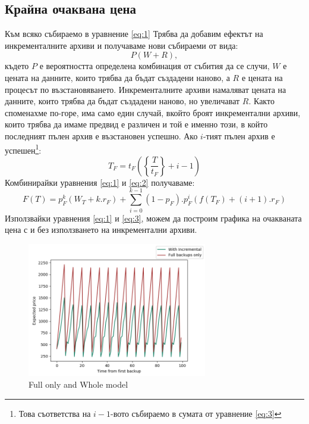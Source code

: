 \documentclass[11pt, a4paper]{article}
\theoremstyle{definition}
\begin{document}
		\subsection{Крайна очаквана цена}
			Към всяко събираемо в уравнение \ref{eq:1} Трябва да добавим ефектът на инкременталните архиви и получаваме нови събираеми от вида:
			$$
			P(W + R),
			$$
			където $P$ е вероятността определена комбинация от събития да се случи, $W$ е цената на данните, които трябва да бъдат създадени наново, а $R$ е цената на процесът по възстановяването. Инкременталните архиви намаляват цената на данните, които трябва да бъдат създадени наново, но увеличават $R$. Както споменахме по-горе, има само един случай, вкойто броят инкрементални архиви, които трябва да имаме предвид е различен и той е именно този, в който последният пълен архив е възстановен успешно. Ако $i$-тият пълен архив е успешен\footnote{Това съответства на $i-1$-вото събираемо в сумата от уравнение \ref{eq:3}}:
			$$
			T_F=t_F\left(\left\{ \frac{T}{t_F} \right\} + i - 1\right)
			$$
			Комбинирайки уравнения \ref{eq:1} и \ref{eq:2} получаваме:
			\begin{equation}\label{eq:3}
			F(T) = p_F^{k}(W_T+k.r_F) + \displaystyle\sum_{i=0}^{k-1}(1-p_F).p_F^{i}\left(f(T_F) + (i+1).r_F\right)
			\end{equation}
			Използвайки уравнения \ref{eq:1} и \ref{eq:3}, можем да построим графика на очакваната цена с и без използването на инкрементални архиви.
			\begin{figure}[H]
				\begin{minipage}{1.0\textwidth}
					\centering
					\includegraphics[width=0.7\textwidth]{Weekly_full.png}
					\caption{Full only and Whole model}\label{Fig:FullWeekly}
				\end{minipage}
			\end{figure}
\end{document}
